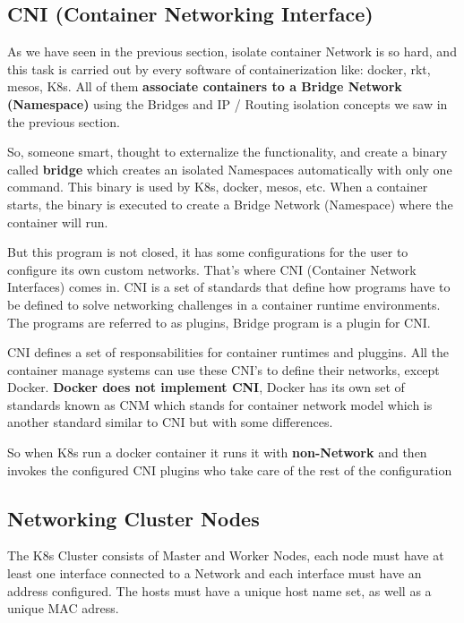 \documentclass{article}
\begin{document}
\subsection{CNI (Container Networking Interface)}

As we have seen in the previous section, isolate container Network is so hard, and this task is carried out by every software of containerization like: docker, rkt, mesos, K8s. All of them \textbf{associate containers to a Bridge Network (Namespace)} using the Bridges and IP / Routing isolation concepts we saw in the previous section.

So, someone smart, thought to externalize the functionality, and create a binary called \textbf{bridge} which creates an isolated Namespaces automatically with only one command. This binary is used by K8s, docker, mesos, etc. When a container starts, the binary is executed to create a Bridge Network (Namespace) where the container will run.

But this program is not closed, it has some configurations for the user to configure its own custom networks. That's where CNI (Container Network Interfaces) comes in. CNI is a set of standards that define how programs have to be defined to solve networking challenges in a container runtime environments. The programs are referred to as plugins, Bridge program is a plugin for CNI.

CNI defines a set of responsabilities  for container runtimes and pluggins. All the container manage systems can use these CNI's to define their networks, except Docker. 
\textbf{Docker does not implement CNI}, Docker has its own set of standards known as CNM which stands for container network model which is another standard similar to CNI but with some differences.

So when K8s run a docker container it runs it with \textbf{non-Network} and then invokes the configured CNI plugins who take care of the rest of the configuration

\subsection{Networking Cluster Nodes}

The K8s Cluster consists of Master and Worker Nodes, each node must have at least one interface connected to a Network and each interface must have an address configured. The hosts must have a unique host name set, as well as a unique MAC adress.
\end{document}

